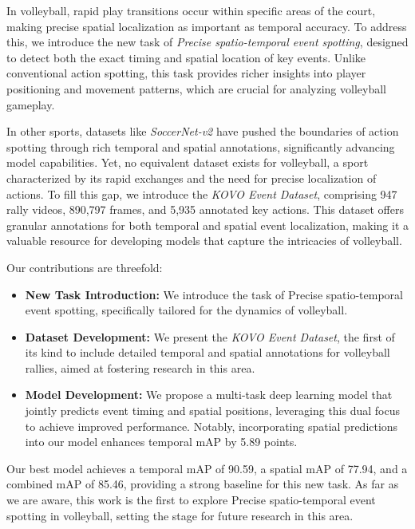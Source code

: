 \documentclass[conference]{IEEEtran}
\begin{document}
In volleyball, rapid play transitions occur within specific areas of the court, making precise spatial localization as important as temporal accuracy. To address this, we introduce the new task of \textit{Precise spatio-temporal event spotting}, designed to detect both the exact timing and spatial location of key events. Unlike conventional action spotting, this task provides richer insights into player positioning and movement patterns, which are crucial for analyzing volleyball gameplay.

In other sports, datasets like \textit{SoccerNet-v2} \cite{soccernetv2} have pushed the boundaries of action spotting through rich temporal and spatial annotations, significantly advancing model capabilities. Yet, no equivalent dataset exists for volleyball, a sport characterized by its rapid exchanges and the need for precise localization of actions. To fill this gap, we introduce the \textit{KOVO Event Dataset}, comprising 947 rally videos, 890,797 frames, and 5,935 annotated key actions. This dataset offers granular annotations for both temporal and spatial event localization, making it a valuable resource for developing models that capture the intricacies of volleyball.

Our contributions are threefold:
\begin{itemize}
    \item \textbf{New Task Introduction:} We introduce the task of Precise spatio-temporal event spotting, specifically tailored for the dynamics of volleyball.
    \item \textbf{Dataset Development:} We present the \textit{KOVO Event Dataset}, the first of its kind to include detailed temporal and spatial annotations for volleyball rallies, aimed at fostering research in this area.
    \item \textbf{Model Development:} We propose a multi-task deep learning model that jointly predicts event timing and spatial positions, leveraging this dual focus to achieve improved performance. Notably, incorporating spatial predictions into our model enhances temporal mAP by 5.89 points.
\end{itemize}

Our best model achieves a temporal mAP of 90.59, a spatial mAP of 77.94, and a combined mAP of 85.46, providing a strong baseline for this new task. As far as we are aware, this work is the first to explore Precise spatio-temporal event spotting in volleyball, setting the stage for future research in this area.
\end{document}
